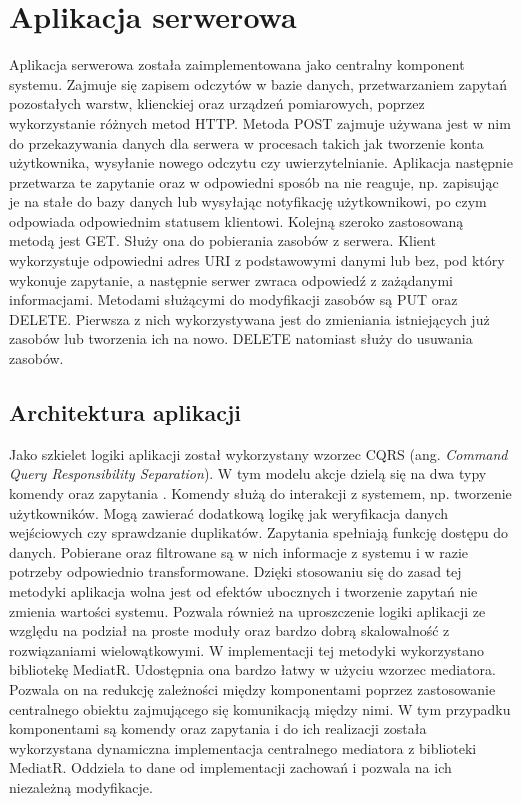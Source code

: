 \section{Aplikacja serwerowa}
Aplikacja serwerowa została zaimplementowana jako centralny komponent systemu.
Zajmuje się zapisem odczytów w bazie danych, przetwarzaniem zapytań
pozostałych warstw, klienckiej oraz urządzeń pomiarowych,
poprzez wykorzystanie różnych metod HTTP.
Metoda POST zajmuje używana jest w nim do przekazywania danych
dla serwera w procesach takich jak tworzenie konta użytkownika,
wysyłanie nowego odczytu czy uwierzytelnianie.
Aplikacja następnie przetwarza te zapytanie oraz w odpowiedni 
sposób na nie reaguje, np. zapisując je na stałe do bazy danych 
lub wysyłając notyfikację użytkownikowi, po czym odpowiada
odpowiednim statusem klientowi.
Kolejną szeroko zastosowaną metodą jest GET. Służy ona do pobierania
zasobów z serwera. Klient wykorzystuje odpowiedni adres URI z
podstawowymi danymi lub bez, pod który wykonuje zapytanie, a
następnie serwer zwraca odpowiedź z zażądanymi informacjami.
Metodami służącymi do modyfikacji zasobów są PUT oraz DELETE.
Pierwsza z nich wykorzystywana jest do zmieniania istniejących
już zasobów lub tworzenia ich na nowo. DELETE natomiast służy
do usuwania zasobów.

\subsection{Architektura aplikacji}
Jako szkielet logiki aplikacji został wykorzystany wzorzec CQRS 
(ang. \textit{Command Query Responsibility Separation}).
W tym modelu akcje dzielą się na dwa typy komendy oraz zapytania \cite{fowler:cqrs}.
Komendy służą do interakcji z systemem, np. tworzenie użytkowników.
Mogą zawierać dodatkową logikę jak weryfikacja danych wejściowych 
czy sprawdzanie duplikatów.
Zapytania spełniają funkcję dostępu do danych. Pobierane oraz
filtrowane są w nich informacje z systemu i w razie potrzeby
odpowiednio transformowane.
Dzięki stosowaniu się do zasad tej metodyki aplikacja wolna
jest od efektów ubocznych i tworzenie zapytań nie zmienia
wartości systemu. Pozwala również na uproszczenie logiki
aplikacji ze względu na podział na proste moduły oraz bardzo
dobrą skalowalność z rozwiązaniami wielowątkowymi.
W implementacji tej metodyki wykorzystano bibliotekę MediatR.
Udostępnia ona bardzo łatwy w użyciu wzorzec mediatora.
Pozwala on na redukcję zależności między komponentami poprzez
zastosowanie centralnego obiektu zajmującego się komunikacją między nimi\cite{freeman2004head}.
W tym przypadku komponentami są komendy oraz zapytania i do ich realizacji
została wykorzystana dynamiczna implementacja centralnego
mediatora z biblioteki MediatR. Oddziela to dane od implementacji
zachowań i pozwala na ich niezależną modyfikacje.

